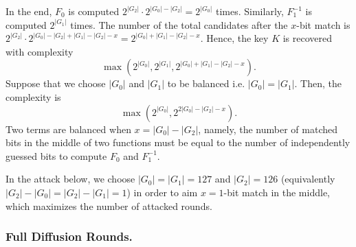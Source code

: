 In the end,
$F_0$ is computed $2^{|G_2|} \cdot 2^{|G_0|-|G_2|} = 2^{|G_0|}$ times.
Similarly, $F_1^{-1}$ is computed $2^{|G_1|}$ times. The number of the total candidates after the $x$-bit match is $2^{|G_2|} \cdot 2^{|G_0|-|G_2| + |G_1|-|G_2| - x} = 2^{|G_0| + |G_1| - |G_2| - x}$. Hence, the key $K$ is recovered with complexity $$\max( 2^{|G_0|}, 2^{|G_1|}, 2^{|G_0| + |G_1| - |G_2| - x}).$$
Suppose that we choose $|G_0|$ and $|G_1|$ to be balanced i.e. $|G_0|=|G_1|$. Then, the complexity is $$\max( 2^{|G_0|}, 2^{2|G_0| - |G_2| - x}).$$
Two terms are balanced when $x = |G_0| - |G_2|$, namely, the number of matched bits in the middle of two functions must be equal to the number of independently guessed bits to compute $F_0$ and $F_1^{-1}$.

In the attack below, we choose $|G_0|=|G_1|=127$ and $|G_2|=126$ (equivalently $|G_2|-|G_0| = |G_2|-|G_1| = 1$) in order to aim $x=1$-bit match in the middle, which maximizes the number of attacked rounds.

\subsubsection{Full Diffusion Rounds.}
